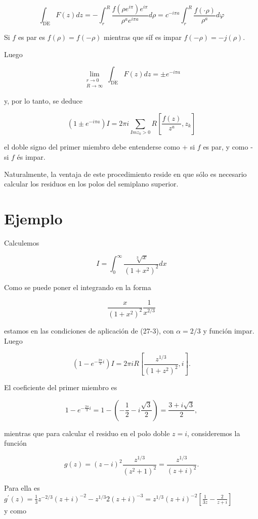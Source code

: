 \documentclass[10pt]{article}
\theoremstyle{plain}
\theoremstyle{definition}
\theoremstyle{remark}
\begin{document}
$$
\int_{\overline{\mathrm{DE}}} F(z) d z=-\int_{r}^{R} \frac{f\left(\rho e^{i \pi}\right) e^{i \pi}}{\rho^{a} e^{i \pi a}} d \rho=c^{-i \pi a} \int_{r}^{R} \frac{f(\cdot \rho)}{\rho^{a}} d \varphi
$$

Si $f$ es par es $f(\rho)=f(-\rho)$ mientras que síf es impar $f(-\rho)=-j(\rho)$.

Luego

$$
\lim _{\substack{r \rightarrow 0 \\ R \rightarrow \infty}} \int_{\overline{\mathrm{DE}}} F(z) d z= \pm e^{-i \pi a}
$$

y, por lo tanto, se deduce


\begin{equation*}
\left(1 \pm e^{-i \pi a}\right) I=2 \pi i \sum_{I m z_{k}>0} R\left[\frac{f(z)}{z^{a}}, z_{k}\right] \tag{27-3}
\end{equation*}


el doble signo del primer miembro debe entenderse como + si $f$ es par, y como - si $f$ és impar.

Naturalmente, la ventaja de este procedimiento reside en que sólo es necesario calcular los residuos en los polos del semiplano superior.

\section*{Ejemplo}
Calculemos

$$
I=\int_{0}^{\infty} \frac{\sqrt[3]{x}}{\left(1+x^{2}\right)^{2}} d x
$$

Como se puede poner el integrando en la forma

$$
\frac{x}{\left(1+x^{2}\right)^{2}} \frac{1}{x^{2 / 3}}
$$

estamos en las condiciones de aplicación de (27-3), con $\alpha=2 / 3$ y función impar. Luego

$$
\left(1-e^{-\frac{2 \pi}{3} i}\right) I=2 \pi i R\left[\frac{z^{1 / 3}}{\left(1+z^{2}\right)^{2}}, i\right] .
$$

El coeficiente del primer miembro es

$$
1-e^{-\frac{2 \pi}{3} i}=1-\left(-\frac{1}{2}-i \frac{\sqrt{3}}{2}\right)=\frac{3+i \sqrt{3}}{2},
$$

mientras que para calcular el residuo en el polo doble $z=i$, consideremos la función

$$
g(z)=(z-i)^{2} \frac{z^{1 / 3}}{\left(z^{2}+1\right)^{2}}=\frac{z^{1 / 3}}{(z+i)^{2}} .
$$

Para ella es\\
$g^{\prime}(z)=\frac{1}{3} z^{-2 / 3}(z+i)^{-2}-z^{1 / 3} 2(z+i)^{-3}=z^{1 / 3}(z+i)^{-2}\left[\frac{1}{3 z}-\frac{2}{z+i}\right]$\\
y como
\end{document}
